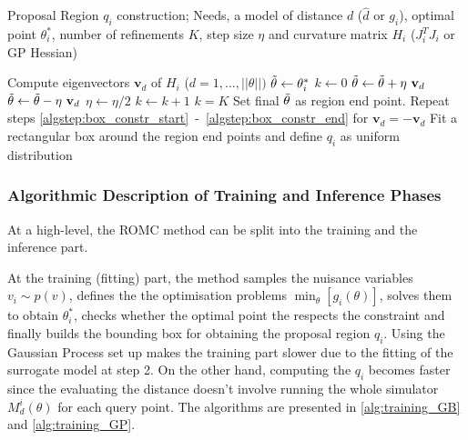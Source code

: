 \documentclass[11pt,twoside]{article}
\numberwithin{Theorem}{section}
\numberwithin{Definition}{section}
\numberwithin{Lemma}{section}
\numberwithin{Algorithm}{section}
\numberwithin{equation}{section}
\begin{document}
\begin{algorithm}[!ht]
	\caption{Proposal Region $q_i$ construction; Needs, a model of distance $d$ ($\hat{d}$ or $g_i$), optimal point $\theta_i^*$, number of refinements $K$, step size $\eta$ and curvature matrix $H_i$ ($J_i^TJ_i $ or GP Hessian)}\label{alg:region_construction}
	\begin{algorithmic}[1]
	\State Compute eigenvectors $\mathbf{v}_{d}$ of $H_i$ {\scriptsize ($d = 1,\ldots,||\theta ||)$}
		\State $\Tilde{\theta} \gets \theta_i^*$ \label{algstep:box_constr_start}
		\State $k \gets 0$
		\Repeat
        	\Repeat
                \State $\Tilde{\theta} \gets \Tilde{\theta} + \eta \ \mathbf{v}_{d}$ 
        	\State $\Tilde{\theta} \gets \Tilde{\theta} - \eta \ \mathbf{v}_{d}$
        	\State $\eta \gets \eta/2$ 
        	\State $k \gets k + 1$
    	\Until $k = K$
    	\State Set final $\Tilde{\theta}$ as region end point. \label{algstep:box_constr_end}
    	\State Repeat steps \ref{algstep:box_constr_start}~-~\ref{algstep:box_constr_end} for $\mathbf{v}_{d} = - \mathbf{v}_{d}$
	\EndFor
	\State Fit a rectangular box around the region end points and define $q_i$ as uniform distribution
	\end{algorithmic}
\end{algorithm}

\subsubsection{Algorithmic Description of Training and Inference Phases}
\label{subsubsec:algorithmic_description}

At a high-level, the ROMC method can be split into the training and the inference part.

At the training (fitting) part, the method samples the nuisance variables $v_i \sim p(v)$, defines the the optimisation problems $\min_\theta [g_i(\theta)]$, solves them to obtain $\theta_i^*$, checks whether the optimal point the respects the constraint and finally builds the bounding box for obtaining the proposal region $q_i$. Using the Gaussian Process set up makes the training part slower due to the fitting of the surrogate model at step 2. On the other hand, computing the $q_i$ becomes faster since the evaluating the distance doesn't involve running the whole simulator $M_d^i(\theta)$ for each query point. The algorithms are presented in \ref{alg:training_GB} and \ref{alg:training_GP}.
\end{document}
